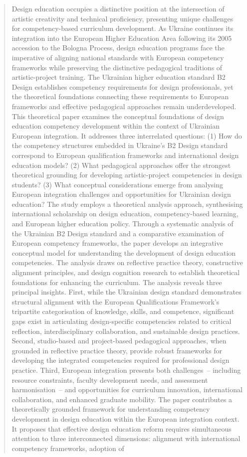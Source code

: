 \documentclass[ed]{acnsart}
\begin{document}
	\begin{abstract}
Design education occupies a distinctive position at the intersection of artistic creativity and technical proficiency, presenting unique challenges for competency-based curriculum development. As Ukraine continues its integration into the European Higher Education Area following its 2005 accession to the Bologna Process, design education programs face the imperative of aligning national standards with European competency frameworks while preserving the distinctive pedagogical traditions of artistic-project training. The Ukrainian higher education standard B2 Design establishes competency requirements for design professionals, yet the theoretical foundations connecting these requirements to European frameworks and effective pedagogical approaches remain underdeveloped. This theoretical paper examines the conceptual foundations of design education competency development within the context of Ukrainian European integration. It addresses three interrelated questions: (1) How do the competency structures embedded in Ukraine's B2 Design standard correspond to European qualification frameworks and international design education models? (2) What pedagogical approaches offer the strongest theoretical grounding for developing artistic-project competencies in design students? (3) What conceptual considerations emerge from analysing European integration challenges and opportunities for Ukrainian design education? The study employs a theoretical analysis approach, synthesising international scholarship on design education, competency-based learning, and European higher education policy. Through a systematic analysis of the Ukrainian B2 Design standard and a comparative examination of European competency frameworks, the paper develops an integrative conceptual model for understanding the development of design education competencies. The analysis draws on reflective practice theory, constructive alignment principles, and design cognition research to establish theoretical foundations for enhancing the curriculum. The analysis reveals three principal insights. First, while the Ukrainian design standard demonstrates structural alignment with the European Qualifications Framework's tripartite categorisation of knowledge, skills, and competence, significant gaps exist in articulating design-specific competencies related to critical reflection, interdisciplinary collaboration, and sustainable design practices. Second, studio-based and project-based pedagogical approaches, when grounded in reflective practice theory, provide robust frameworks for developing the integrated competencies required for professional design practice. Third, European integration presents both challenges~-- including resource constraints, faculty development needs, and assessment harmonisation~-- and opportunities for curriculum innovation, international collaboration, and enhanced graduate mobility. The paper contributes a theoretically grounded framework for understanding competency development in design education within the European integration context. It proposes that effective design education reform requires simultaneous attention to three interconnected dimensions: alignment with international competency frameworks, adoption of 
\end{abstract}
\end{document}
